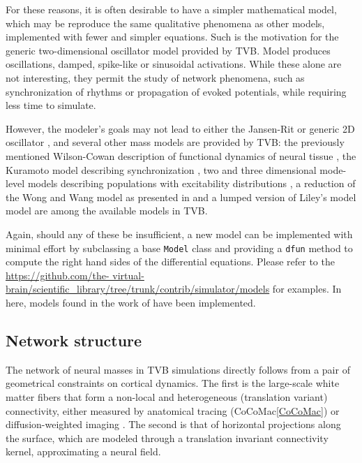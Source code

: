 	For these reasons, it is often desirable to have a simpler mathematical 
	model, which may be reproduce the same qualitative phenomena as other 
	models, implemented with fewer and simpler equations. Such is the motivation
	for the generic two-dimensional oscillator model provided by TVB. 
	Model produces oscillations, damped, spike-like or 
	sinusoidal activations. While these alone are not interesting, they 
	permit the study of network phenomena, such as synchronization of rhythms
	or propagation of evoked potentials, while requiring less time to simulate.

	However, the modeler's goals may not lead to either the Jansen-Rit
	\cite{Jansen_1995, David_2003, David_2004} or generic 2D oscillator
	\cite{FitzHugh_1961, Nagumo_1962}, and several other mass models are
	provided by TVB: the previously mentioned Wilson-Cowan description of
	functional dynamics of neural tissue \cite{Wilson_1972}, the Kuramoto
	model describing synchronization \cite{Kuramoto_1975, Cabral_2011}, two
	and three dimensional mode-level models describing populations with
	excitability distributions \cite{Stefanescu_2011, Stefanescu_2008}, a
	reduction of the Wong and Wang model \cite{Wong_2006} as presented in
	\cite{Deco_2013} and a lumped version of Liley's model \cite{Liley_1999,
	Steyn-Ross_1999} model are among the available models in TVB.

	Again, should any of these be insufficient, a new model can be implemented
	with minimal effort by subclassing a base \texttt{Model} class and
	providing a  \texttt{dfun} method to compute the right hand sides of the
	differential  equations. Please refer to the \url{https://github.com/the-
	virtual-brain/scientific_library/tree/trunk/contrib/simulator/models} for
	examples. In here, models found in the work of \cite{Larter_1999,
	Breakspear_2003, Morris_1981, Hindmarsh_1984, Brunel_2001} have been implemented.

	

\subsection{Network structure}

	The network of neural masses in TVB simulations directly follows from  a
	pair of geometrical constraints on cortical dynamics. The first is the
	large-scale white matter fibers that form a non-local and heterogeneous
	(translation variant) connectivity, either measured by anatomical tracing
	(CoCoMac\ref{CoCoMac}) or diffusion-weighted imaging \cite{Hagmann_2008,
	Honey_2009, Bastiani_2012}. The second is that of horizontal projections
	along the surface, which are modeled through a translation invariant
	 connectivity kernel,
	approximating a neural field.


